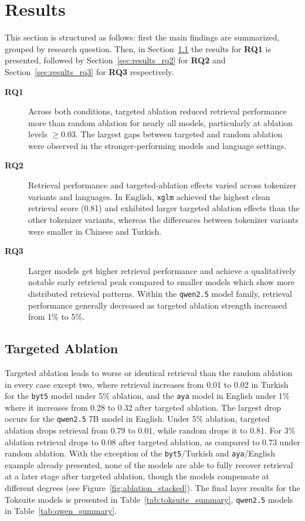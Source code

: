 \chapter{Results} \label{cha:results}

This section is structured as follows: first the main findings are summarized, grouped by research question. Then, in Section~\ref{sec:results_rq1} the results for \textbf{RQ1} is presented, followed by Section~\ref{sec:results_rq2} for \textbf{RQ2} and Section~\ref{sec:results_rq3} for \textbf{RQ3} respectively.

\begin{description}

\item[\textbf{RQ1}] Across both conditions, targeted ablation reduced retrieval performance more than random ablation for nearly all models, particularly at ablation levels $\geq$0.03. The largest gaps between targeted and random ablation were observed in the stronger-performing models and language settings.

\item[\textbf{RQ2}] Retrieval performance and targeted-ablation effects varied across tokenizer variants and languages. In English, \texttt{xglm} achieved the highest clean retrieval score (0.81) and exhibited larger targeted ablation effects than the other tokenizer variants, whereas the differences between tokenizer variants were smaller in Chinese and Turkish.

\item[\textbf{RQ3}] Larger models get higher retrieval performance and achieve a qualitatively notable early retrieval peak compared to smaller models which show more distributed retrieval patterns. Within the \texttt{qwen2.5} model family, retrieval performance generally decreased as targeted ablation strength increased from 1\% to 5\%.

\end{description}

\section{Targeted Ablation}\label{sec:results_rq1}

Targeted ablation leads to worse or identical retrieval than the random ablation in every case except two, where retrieval increases from 0.01 to 0.02 in Turkish for the \texttt{byt5} model under 5\% ablation, and the \texttt{aya} model in English under 1\% where it increases from 0.28 to 0.32 after targeted ablation. The largest drop occurs for the \texttt{qwen2.5} 7B model in English. Under 5\% ablation, targeted ablation drops retrieval from 0.79 to 0.01, while random drops it to 0.81. For 3\% ablation retrieval drops to 0.08 after targeted ablation, as compared to 0.73 under random ablation. With the exception of the \texttt{byt5}/Turkish and \texttt{aya}/English example already presented, none of the models are able to fully recover retrieval at a later stage after targeted ablation, though the models compensate at different degrees (see Figure~\ref{fig:ablation_stacked}). The final layer results for the Toksuite models is presented in Table~\ref{tab:toksuite_summary}, \texttt{qwen2.5} models in Table~\ref{tab:qwen_summary}.

